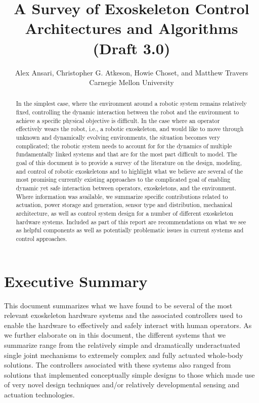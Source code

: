 \documentclass[letterpaper,12pt,fullpage]{article}
\begin{document}
\title{A Survey of Exoskeleton Control Architectures and
Algorithms\\
(Draft 3.0)}

\author{Alex Ansari, Christopher G. Atkeson, Howie Choset, and Matthew Travers\\
Carnegie Mellon University}

\maketitle

\begin{abstract}
In the simplest case, where the environment around a robotic system remains relatively fixed, controlling the dynamic interaction between the robot and the environment to achieve a specific physical objective is difficult.  In the case where an operator effectively wears the robot, i.e., a robotic exoskeleton, and would like to move through unknown and dynamically evolving environments, the situation becomes very complicated; the robotic system needs to account for for the dynamics of multiple fundamentally linked systems and that are for the most part difficult to model.  The goal of this document is to provide a survey of the literature on the design, modeling, and control of robotic exoskeletons and to highlight what we believe are several of the most promising currently existing approaches to the complicated goal of enabling dynamic yet safe interaction between operators, exoskeletons, and the environment.  Where information was available, we summarize specific contributions related to actuation, power storage and generation, sensor type and distribution, mechanical architecture, as well as control system design for a number of different exoskeleton hardware systems.  Included as part of this report are recommendations on what we see as helpful components as well as potentially problematic issues in current systems and control approaches. 
\end{abstract}

\section{Executive Summary}

This document summarizes what we have found to be several of the most relevant exoskeleton hardware systems and the associated controllers used to enable the hardware to effectively and safely interact with human operators.  As we further elaborate on in this document, the different systems that we summarize range from the relatively simple and dramatically underactuated single joint mechanisms to extremely complex and fully actuated whole-body solutions.  The controllers associated with these systems also ranged from solutions that implemented conceptually simple designs to those which made use of very novel design techniques and/or relatively developmental sensing and actuation technologies. 
\end{document}
